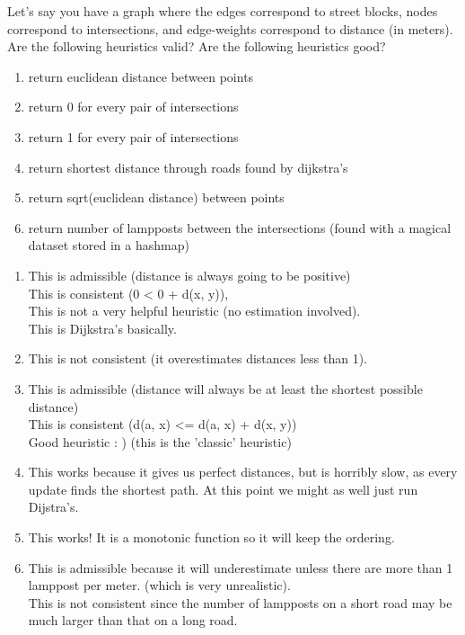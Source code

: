 
\question Let’s say you have a graph where the edges correspond to street blocks, nodes correspond to intersections, and edge-weights correspond to distance (in meters). Are the following heuristics valid? Are the following heuristics good?

\begin{enumerate}
    \item return euclidean distance between points
    \item return 0 for every pair of intersections
    \item return 1 for every pair of intersections
    \item return shortest distance through roads found by dijkstra's 
    \item return sqrt(euclidean distance) between points
    \item return number of lampposts between the intersections (found with a magical dataset stored in a hashmap)
\end{enumerate}


\begin{solution}

\begin{enumerate}
    \item This is admissible (distance is always going to be positive) 
    \\ This is consistent (0 < 0 + d(x, y)), 
    \\ This is not a very helpful heuristic (no estimation involved). 
    \\ This is Dijkstra's basically.
    \item This is not consistent (it overestimates distances less than 1).
    \item This is admissible (distance will always be at least the shortest possible distance)
    \\ This is consistent (d(a, x) <= d(a, x) + d(x, y))
    \\ Good heuristic : ) (this is the 'classic' heuristic)
    \item This works because it gives us perfect distances, but is horribly slow, as every update finds the shortest path. At this point we might as well just run Dijstra's.
    \item This works! It is a monotonic function so it will keep the ordering.
    \item This is admissible because it will underestimate unless there are more than 1 lamppost per meter. (which is very unrealistic).
    \\ This is not consistent since the number of lampposts on a short road may be much larger than that on a long road.

\end{enumerate}

\end{solution}